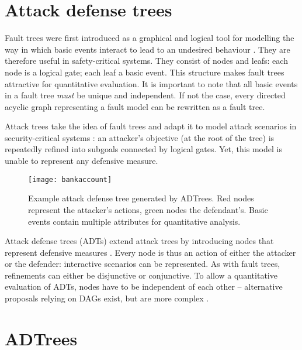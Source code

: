 \documentclass{scrreprt}
\begin{document}
\section{Attack defense trees}

Fault trees were first introduced as a graphical and logical tool for modelling
the way in which basic events interact to lead to an undesired behaviour
\cite[IV.1]{Vesely1981}. They are therefore useful in safety-critical systems.
They consist of nodes and leafs: each node is a logical gate; each leaf a basic
event. This structure makes fault trees attractive for quantitative evaluation.
It is important to note that all basic events in a fault tree \textit{must} be
unique and independent. If not the case, every directed acyclic graph
representing a fault model can be rewritten as a fault tree.  

Attack trees take the idea of fault trees and adapt it to model attack scenarios
in security-critical systems \cite{Schneier1999} \cite{Brooke2003}
\cite{NaiFovino2009}: an attacker's objective (at the root of the tree) is
repeatedly refined into subgoals connected by logical gates. Yet, this model is
unable to represent any defensive measure.

\begin{figure}[h!]
    \label{example-adt}
    \centering
    \texttt{[image: bankaccount]}
    \caption{Example attack defense tree generated by ADTrees. Red nodes
    represent the attacker's actions, green nodes the defendant's. Basic events
    contain multiple attributes for quantitative analysis.}
\end{figure}

Attack defense trees (ADTs) extend attack trees by introducing nodes that
represent defensive measures \cite{KordyFoundations}. Every node is thus an
action of either the attacker or the defender: interactive scenarios can be
represented.  As with fault trees, refinements can either be disjunctive or
conjunctive. To allow a quantitative evaluation of ADTs, nodes have to be
independent of each other -- alternative proposals relying on DAGs exist, but
are more complex \cite{KordyDAG}.



\section{ADTrees}
\end{document}
